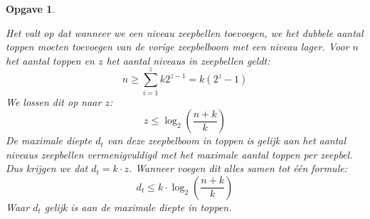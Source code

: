 \documentclass[12pt,hidelinks]{article}
\newtheorem{opgave}{Opgave}
\begin{document}
\begin{opgave}
\begin{enumerate}[a.]
            Het valt op dat wanneer we een niveau zeepbellen toevoegen, we het dubbele aantal toppen moeten toevoegen van de vorige zeepbelboom met een niveau lager. 
            Voor $n$ het aantal toppen en $z$ het aantal niveaus in zeepbellen geldt: 
            $$n \ge \sum\limits_{i=1}^z k2^{z-1} = k(2^z-1)$$
            We lossen dit op naar $z$: $$z \le \log_2{\left(\dfrac{n+k}{k}\right)}$$
            De maximale diepte $d_t$ van deze zeepbelboom in toppen is gelijk aan het aantal niveaus zeepbellen vermenigvuldigd met het maximale aantal toppen per zeepbel.
            Dus krijgen we dat $d_t=k\cdot z$.
            Wanneer voegen dit alles samen tot één formule:
            \begin{equation}
                d_t \le k \cdot \log_2{\left(\dfrac{n+k}{k}\right)}
                \label{topdiepte}
            \end{equation}
            Waar $d_t$ gelijk is aan de maximale diepte in toppen.
        \endgroup 
\end{enumerate}
    \end{opgave}	
\end{document}
